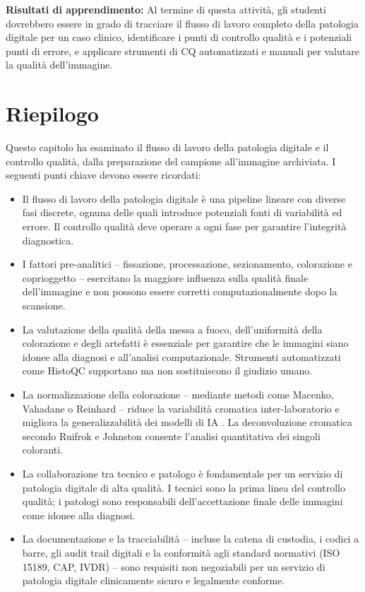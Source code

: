 \textbf{Risultati di apprendimento:} Al termine di questa attività, gli studenti dovrebbero
essere in grado di tracciare il flusso di lavoro completo della patologia digitale per un caso
clinico, identificare i punti di controllo qualità e i potenziali punti di errore, e applicare
strumenti di CQ automatizzati e manuali per valutare la qualità dell'immagine.

\section{Riepilogo}
\label{sec:ch2-summary}

Questo capitolo ha esaminato il flusso di lavoro della patologia digitale e il controllo qualità,
dalla preparazione del campione all'immagine archiviata. I seguenti punti chiave devono essere
ricordati:

\begin{itemize}
    \item Il flusso di lavoro della patologia digitale è una pipeline lineare con diverse fasi
    discrete, ognuna delle quali introduce potenziali fonti di variabilità ed errore. Il controllo
    qualità deve operare a ogni fase per garantire l'integrità diagnostica.

    \item I fattori pre-analitici -- fissazione, processazione, sezionamento, colorazione e
    coprioggetto -- esercitano la maggiore influenza sulla qualità finale dell'immagine e non
    possono essere corretti computazionalmente dopo la scansione.

    \item La valutazione della qualità della messa a fuoco, dell'uniformità della colorazione e
    degli artefatti è essenziale per garantire che le immagini siano idonee alla diagnosi e
    all'analisi computazionale. Strumenti automatizzati come HistoQC \cite{janowczyk2019}
    supportano ma non sostituiscono il giudizio umano.

    \item La normalizzazione della colorazione -- mediante metodi come Macenko, Vahadane o
    Reinhard -- riduce la variabilità cromatica inter-laboratorio e migliora la
    generalizzabilità dei modelli di IA \cite{tellez2019}. La deconvoluzione cromatica secondo
    Ruifrok e Johnston \cite{ruifrok2001} consente l'analisi quantitativa dei singoli coloranti.

    \item La collaborazione tra tecnico e patologo è fondamentale per un servizio di patologia
    digitale di alta qualità. I tecnici sono la prima linea del controllo qualità; i patologi
    sono responsabili dell'accettazione finale delle immagini come idonee alla diagnosi.

    \item La documentazione e la tracciabilità -- incluse la catena di custodia, i codici a
    barre, gli audit trail digitali e la conformità agli standard normativi (ISO 15189, CAP,
    IVDR) -- sono requisiti non negoziabili per un servizio di patologia digitale clinicamente
    sicuro e legalmente conforme.
\end{itemize}

